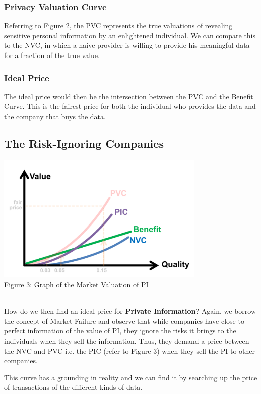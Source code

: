 \documentclass{icmmcm}
\begin{document}
\subsubsection*{Privacy Valuation Curve} Referring to Figure 2, the PVC represents the true valuations of revealing sensitive personal information by an enlightened individual. We can compare this to the NVC, in which a naive provider is willing to provide his meaningful data for a fraction of the true value. 

\subsubsection*{Ideal Price} The ideal price would then be the intersection between the PVC and the Benefit Curve. This is the fairest price for both the individual who provides the data and the company that buys the data.

\subsection{The Risk-Ignoring Companies}

\includegraphics[width=0.75\textwidth]{Picture3.png} \\
\caption{Figure 3: Graph of the Market Valuation of PI} \\

How do we then find an ideal price for \textbf{Private Information}?
Again, we borrow the concept of Market Failure and observe that while companies have close to perfect information of the value of PI, they ignore the risks it brings to the individuals when they sell the information. Thus, they demand a price between the NVC and PVC i.e. the PIC (refer to Figure 3) when they sell the PI to other companies. 

This curve has a grounding in reality and we can find it by searching up the price of transactions of the different kinds of data. 
\end{document}
